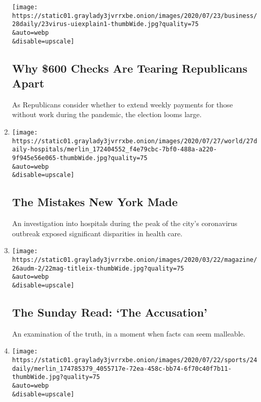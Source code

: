 \begin{enumerate}
  \texttt{[image: https://static01.graylady3jvrrxbe.onion/images/2020/07/23/business/28daily/23virus-uiexplain1-thumbWide.jpg?quality=75\\\&auto=webp\\\&disable=upscale]}

  \hypertarget{why-600-checks-are-tearing-republicans-apart}{%
  \subsection{Why \$600 Checks Are Tearing Republicans
  Apart}\label{why-600-checks-are-tearing-republicans-apart}}

  As Republicans consider whether to extend weekly payments for those
  without work during the pandemic, the election looms large.
\item
  \href{/2020/07/27/podcasts/the-daily/new-york-hospitals-covid.html}{}

  \texttt{[image: https://static01.graylady3jvrrxbe.onion/images/2020/07/27/world/27daily-hospitals/merlin\_172404552\_f4e79cbc-7bf0-488a-a220-9f945e56e065-thumbWide.jpg?quality=75\\\&auto=webp\\\&disable=upscale]}

  \hypertarget{the-mistakes-new-york-made}{%
  \subsection{The Mistakes New York
  Made}\label{the-mistakes-new-york-made}}

  An investigation into hospitals during the peak of the city's
  coronavirus outbreak exposed significant disparities in health care.
\item
  \href{/2020/07/26/podcasts/the-daily/the-accusation-the-sunday-read.html}{}

  \texttt{[image: https://static01.graylady3jvrrxbe.onion/images/2020/03/22/magazine/26audm-2/22mag-titleix-thumbWide.jpg?quality=75\\\&auto=webp\\\&disable=upscale]}

  \hypertarget{the-sunday-read-the-accusation}{%
  \subsection{The Sunday Read: `The
  Accusation'}\label{the-sunday-read-the-accusation}}

  An examination of the truth, in a moment when facts can seem
  malleable.
\item
  \href{/2020/07/24/podcasts/the-daily/mlb-baseball-season-coronavirus.html}{}

  \texttt{[image: https://static01.graylady3jvrrxbe.onion/images/2020/07/22/sports/24daily/merlin\_174785379\_4055717e-72ea-458c-bb74-6f70c40f7b11-thumbWide.jpg?quality=75\\\&auto=webp\\\&disable=upscale]}


\end{enumerate}
